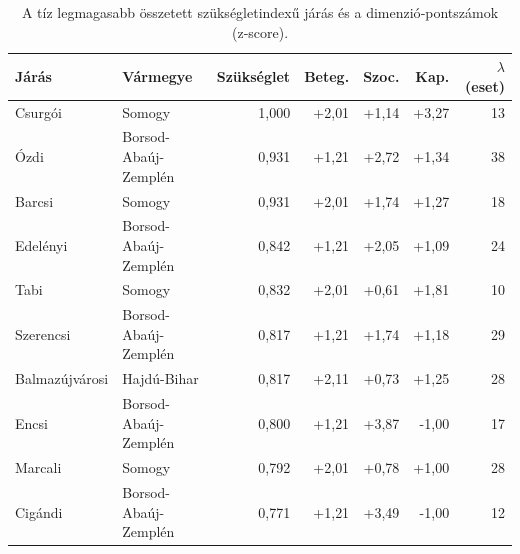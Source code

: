 \begin{table}[htbp]
\centering
\small
\begin{tabular}{llrrrrr}
\toprule
Járás & Vármegye & Szükséglet & Beteg. & Szoc. & Kap. & $\lambda$ (eset) \\
\midrule
Csurgói & Somogy & 1{,}000 & +2{,}01 & +1{,}14 & +3{,}27 & 13 \\
Ózdi & Borsod-Abaúj-Zemplén & 0{,}931 & +1{,}21 & +2{,}72 & +1{,}34 & 38 \\
Barcsi & Somogy & 0{,}931 & +2{,}01 & +1{,}74 & +1{,}27 & 18 \\
Edelényi & Borsod-Abaúj-Zemplén & 0{,}842 & +1{,}21 & +2{,}05 & +1{,}09 & 24 \\
Tabi & Somogy & 0{,}832 & +2{,}01 & +0{,}61 & +1{,}81 & 10 \\
Szerencsi & Borsod-Abaúj-Zemplén & 0{,}817 & +1{,}21 & +1{,}74 & +1{,}18 & 29 \\
Balmazújvárosi & Hajdú-Bihar & 0{,}817 & +2{,}11 & +0{,}73 & +1{,}25 & 28 \\
Encsi & Borsod-Abaúj-Zemplén & 0{,}800 & +1{,}21 & +3{,}87 & -1{,}00 & 17 \\
Marcali & Somogy & 0{,}792 & +2{,}01 & +0{,}78 & +1{,}00 & 28 \\
Cigándi & Borsod-Abaúj-Zemplén & 0{,}771 & +1{,}21 & +3{,}49 & -1{,}00 & 12 \\
\bottomrule
\end{tabular}
\caption{A tíz legmagasabb összetett szükségletindexű járás és a dimenzió‑pontszámok (z‑score).}
\label{tab:needtop}
\end{table}
